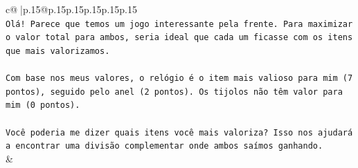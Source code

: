 \documentclass{article}
\begin{document}
{\begin{supertabular}{c@{$\;$}|p{.15\linewidth}@{}p{.15\linewidth}p{.15\linewidth}p{.15\linewidth}p{.15\linewidth}p{.15\linewidth}}
{{{\\ 
\texttt{Olá! Parece que temos um jogo interessante pela frente. Para maximizar o valor total para ambos, seria ideal que cada um ficasse com os itens que mais valorizamos.} \\
\\ 
\texttt{Com base nos meus valores, o relógio é o item mais valioso para mim (7 pontos), seguido pelo anel (2 pontos). Os tijolos não têm valor para mim (0 pontos).} \\
\\ 
\texttt{Você poderia me dizer quais itens você mais valoriza? Isso nos ajudará a encontrar uma divisão complementar onde ambos saímos ganhando.} \\
            }
        }
    }
    & \\ \\


\end{supertabular}}
\end{document}
